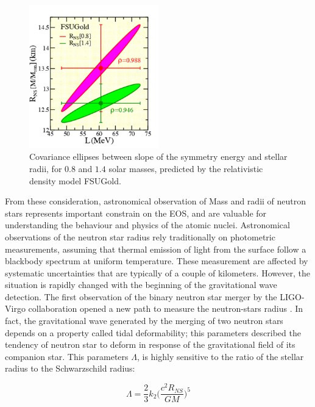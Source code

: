 \begin{figure}[hbtp]
\centering
\includegraphics[width = 0.5\textwidth]{Introduzione/LvsRns.pdf}
\caption{Covariance ellipses between slope of the symmetry energy and stellar radii, for $0.8$ and $1.4$ solar masses, predicted by the relativistic density model FSUGold.}
\end{figure}

From these consideration, astronomical observation of Mass and radii of neutron stars represents important constrain on the EOS, and are valuable for understanding the behaviour and physics of the atomic nuclei.
Astronomical observations of the neutron star radius rely traditionally on photometric measurements, assuming that thermal emission of light from the surface follow a blackbody spectrum at uniform temperature. These measurement are affected by systematic uncertainties that are typically of a couple of kilometers.
However, the situation is rapidly changed with the beginning of the gravitational wave detection. The first observation of the binary neutron star merger by the LIGO-Virgo collaboration opened a new path to measure the neutron-stars radius \cite{LIGOScientific:2017vwq}. In fact, the gravitational wave generated by the merging of two neutron stars depends on a property called tidal deformability; this parameters described the tendency of neutron star to deform in response of the gravitational field of its companion star. This parameters $\Lambda$, is highly sensitive to the ratio of the stellar radius to the Schwarzschild radius:

\begin{equation}
\Lambda = \frac{2}{3} k_{2} \big( \dfrac{c^{2} R_{NS}}{GM} \big)^{5}
\end{equation}

